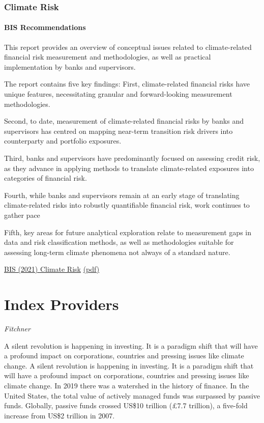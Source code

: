 \documentclass[
]{book}
\begin{document}
\hypertarget{climate-risk}{%
\subsubsection{Climate Risk}\label{climate-risk}}

\hypertarget{bis-recommendations}{%
\paragraph{BIS Recommendations}\label{bis-recommendations}}

This report provides an overview of conceptual issues related to climate-related financial risk
measurement and methodologies, as well as practical implementation by banks and supervisors.

The report contains five key findings:
First, climate-related financial risks have unique features, necessitating granular and
forward-looking measurement methodologies.

Second, to date, measurement of climate-related financial risks by banks and supervisors
has centred on mapping near-term transition risk drivers into counterparty and portfolio exposures.

Third, banks and supervisors have predominantly focused on assessing credit risk, as they
advance in applying methods to translate climate-related exposures into categories of financial risk.

Fourth, while banks and supervisors remain at an early stage of translating climate-related
risks into robustly quantifiable financial risk, work continues to gather pace

Fifth, key areas for future analytical exploration relate to measurement gaps in data and
risk classification methods, as well as methodologies suitable for assessing long-term climate
phenomena not always of a standard nature.

\href{https://www.bis.org/bcbs/publ/d518.htm}{BIS (2021) Climate Risk}
\href{pdf/BIS_2021_Climate_Risk.pdf}{(pdf)}

\hypertarget{index-providers}{%
\section{Index Providers}\label{index-providers}}

\emph{Fitchner}

A silent revolution is happening in investing. It is a paradigm shift that will have a profound impact on corporations, countries and pressing issues like climate change.
A silent revolution is happening in investing. It is a paradigm shift that will have a profound impact on corporations, countries and pressing issues like climate change.
In 2019 there was a watershed in the history of finance. In the United States, the total value of actively managed funds was surpassed by passive funds. Globally, passive funds crossed US\$10 trillion (£7.7 trillion), a five-fold increase from US\$2 trillion in 2007.
\end{document}
